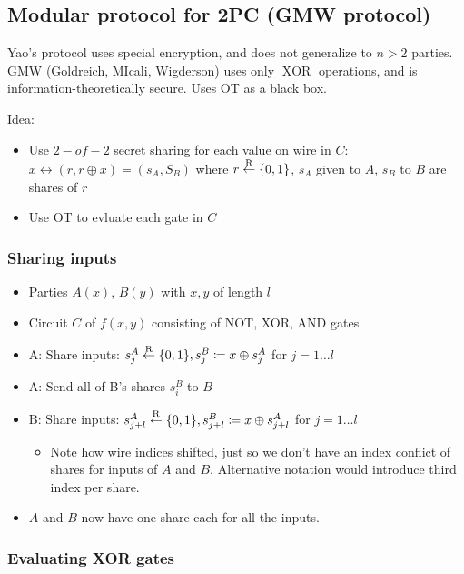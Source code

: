 \subsection{Modular protocol for 2PC (GMW protocol)}

Yao's protocol uses special encryption, and does not generalize to $n > 2$
parties. GMW (Goldreich, MIcali, Wigderson) uses only $\operatorname{XOR}$
operations, and is information-theoretically secure. Uses OT as a black box.

Idea:
\begin{itemize}
		\item Use $2-of-2$ secret sharing for each value on wire in $C$: $x
				\leftrightarrow (r, r \oplus x) = (s_A, S_B)$ where $r \overset{\mathrm{R}}{\gets}
				\{0, 1\}$, $s_A$ given to $A$, $s_B$ to $B$ are shares of $r$
		\item Use OT to evluate each gate in $C$
\end{itemize}

\subsubsection{Sharing inputs}

\begin{itemize}
		\item Parties $A(x)$, $B(y)$ with $x, y$ of length $l$
		\item Circuit $C$ of $f(x, y)$ consisting of NOT, XOR, AND gates
		\item A: Share inputs: $s^A_j \overset{\mathrm{R}}{\gets} \{0, 1\}, s^B_j \coloneqq x \oplus
				s^A_j$ for $j = 1 \ldots l$
		\item A: Send all of B's shares $s^B_i$ to $B$
		\item B: Share inputs: $s^A_{j+l} \overset{\mathrm{R}}{\gets} \{0, 1\}, s^B_{j+l} \coloneqq x \oplus
				s^A_{j+l}$ for $j = 1 \ldots l$
				\begin{itemize}
						\item Note how wire indices shifted, just so we don't
								have an index conflict of shares for inputs of
								$A$ and $B$. Alternative notation would
								introduce third index per share.
				\end{itemize}
		\item $A$ and $B$ now have one share each for all the inputs.
\end{itemize}

\subsubsection{Evaluating XOR gates}

